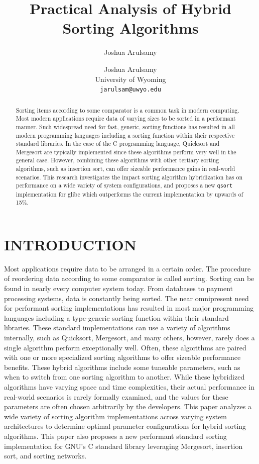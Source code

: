 \documentclass[12pt, conference]{ieeeconf}
\title{\LARGE \bf Practical Analysis of Hybrid Sorting Algorithms}
\author{Joshua Arulsamy}
\author{\parbox{3 in}{
\centering
Joshua Arulsamy\\
University of Wyoming\\
{\tt\small jarulsam@uwyo.edu}}}
\begin{document}
\maketitle
\thispagestyle{plain}
\pagestyle{plain}
\nocite{*}

\begin{abstract}

	Sorting items according to some comparator is a common task in modern
	computing. Most modern applications require data of varying sizes to be sorted
	in a performant manner. Such widespread need for fast, generic, sorting
	functions has resulted in all modern programming languages including a sorting
	function within their respective standard libraries. In the case of the C
	programming language, Quicksort and Mergesort are typically implemented since
	these algorithms perform very well in the general case. However, combining
	these algorithms with other tertiary sorting algorithms, such as insertion
	sort, can offer sizeable performance gains in real-world scenarios. This
	research investigates the impact sorting algorithm hybridization has on
	performance on a wide variety of system configurations, and proposes a new
	\texttt{qsort} implementation for glibc which outperforms the current
	implementation by upwards of 15\%.

\end{abstract}

\section{INTRODUCTION}

Most applications require data to be arranged in a certain order. The procedure
of reordering data according to some comparator is called sorting. Sorting can
be found in nearly every computer system today. From databases to payment
processing systems, data is constantly being sorted. The near omnipresent need
for performant sorting implementations has resulted in most major programming
languages including a type-generic sorting function within their standard
libraries. These standard implementations can use a variety of algorithms
internally, such as Quicksort, Mergesort, and many others, however, rarely does
a single algorithm perform exceptionally well. Often, these algorithms are
paired with one or more specialized sorting algorithms to offer sizeable
performance benefits. These hybrid algorithms include some tuneable parameters,
such as when to switch from one sorting algorithm to another. While these
hybridized algorithms have varying space and time complexities, their actual
performance in real-world scenarios is rarely formally examined, and the values
for these parameters are often chosen arbitrarily by the developers. This paper
analyzes a wide variety of sorting algorithm implementations across varying
system architectures to determine optimal parameter configurations for hybrid
sorting algorithms. This paper also proposes a new performant standard sorting
implementation for GNU's C standard library leveraging Mergesort, insertion
sort, and sorting networks.
\end{document}

